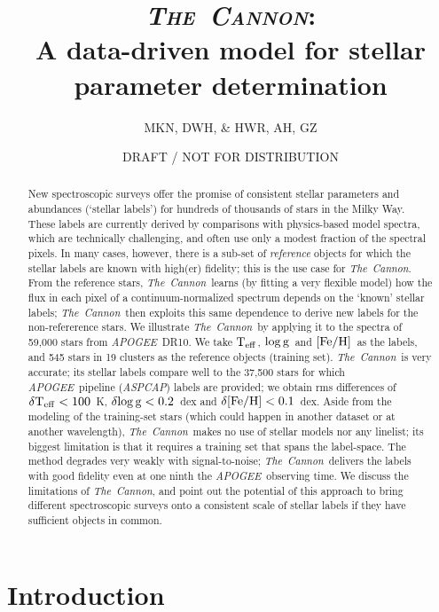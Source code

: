 \documentclass[12pt, preprint]{aastex}
\newcommand{\teff}{\mbox{$\rm T_{eff}$}}
\newcommand{\feh}{\mbox{$\rm [Fe/H]$}}
\newcommand{\logg}{\mbox{$\rm \log g$}}
\newcommand{\tc}{\textsl{The~Cannon}}
\newcommand{\apogee}{\textsl{APOGEE}}
\newcommand{\aspcap}{\textsl{ASPCAP}}
\begin{document}
\title{\textsc{\tc:}\\ A data-driven model for stellar parameter determination}
\author{
  MKN,
  DWH,
  \&
  HWR,
  AH, GZ} 
\date{DRAFT / NOT FOR DISTRIBUTION}



\begin{abstract}%
New spectroscopic surveys offer the promise of consistent stellar
parameters and abundances (`stellar labels') for hundreds of thousands
of stars in the Milky Way. 
These labels are currently derived by comparisons with physics-based
model spectra, which are technically challenging, and often use only a
modest fraction of the spectral pixels. 
In many cases, however, there is a sub-set of \emph{reference}
objects for which the stellar labels are known with high(er)
fidelity; this is the use case for \tc.
From the reference stars, \tc\ learns (by fitting a very flexible
model) how the flux in each pixel of a continuum-normalized spectrum
depends on the `known' stellar labels; \tc\ then exploits this same
dependence to derive new labels for the non-refererence stars.
We illustrate \tc\ by applying it to the spectra of 59,000 stars from
\apogee\ DR10. 
We take \teff, \logg\ and \feh\ as the labels, and 545 stars in 19
clusters as the reference objects (training set). 
\tc\ is very accurate; its stellar labels compare well to the 37,500
stars for which \apogee\ pipeline (\aspcap) labels are provided; we
obtain rms differences of $\delta\teff< 100$~K, $\delta\logg< 0.2$~dex
and $\delta\feh< 0.1$~dex.
Aside from the modeling of the training-set stars (which could happen
in another dataset or at another wavelength), \tc\ makes no use of
stellar models nor any linelist; its biggest limitation is that it
requires a training set that spans the label-space. 
The method degrades very weakly with signal-to-noise; \tc\ delivers
the labels with good fidelity even at one ninth the
\apogee\ observing time. 
We discuss the limitations of \tc, and point out the potential of this
approach to bring different spectroscopic surveys onto a consistent
scale of stellar labels if they have sufficient objects in common.
\end{abstract}


\section{Introduction}
\end{document}
